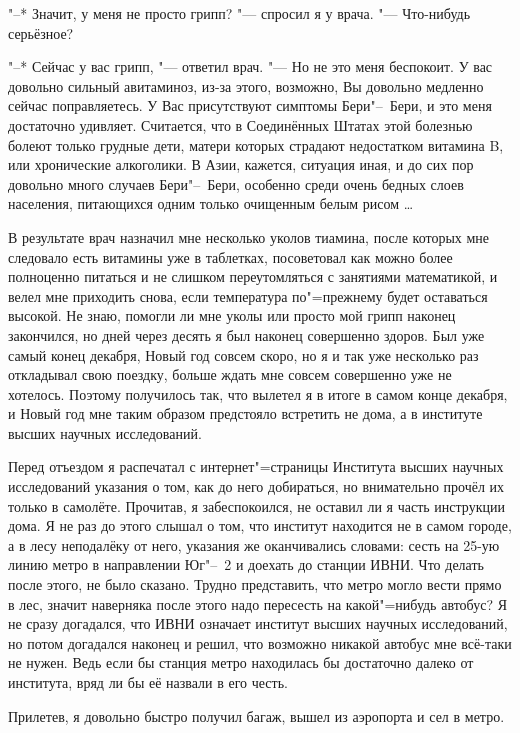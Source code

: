 "--* Значит, у меня не просто грипп? "--- спросил я у врача.
"--- Что-нибудь серьёзное?

"--* Сейчас у вас грипп, "--- ответил врач.
"--- Но не это меня беспокоит.
У вас довольно сильный авитаминоз, из-за этого, возможно, Вы довольно медленно
сейчас поправляетесь.
У Вас присутствуют симптомы Бери"--~Бери, и это меня достаточно удивляет.
Считается, что в Соединённых Штатах этой болезнью болеют только грудные дети,
матери которых страдают недостатком витамина B, или хронические алкоголики.
В Азии, кажется, ситуация иная, и до сих пор довольно много случаев Бери"--~Бери,
особенно среди очень бедных слоев населения, питающихся одним только очищенным
белым рисом \ldots

В результате врач назначил мне несколько уколов тиамина, после которых мне
следовало есть витамины уже в таблетках, посоветовал как можно более полноценно
питаться и не слишком переутомляться с занятиями математикой, и велел мне
приходить снова, если температура по"=прежнему будет оставаться высокой.
Не знаю, помогли ли мне уколы или просто мой грипп наконец закончился, но дней
через десять я был наконец совершенно здоров.
Был уже самый конец декабря, Новый год совсем скоро, но я и так уже несколько
раз откладывал свою поездку, больше ждать мне совсем совершенно уже не хотелось.
Поэтому получилось так, что вылетел я в итоге в самом конце декабря, и Новый год
мне таким образом предстояло встретить не дома, а в институте высших научных
исследований.

Перед отъездом я распечатал с интернет"=страницы Института высших научных
исследований указания о том, как до него добираться, но внимательно прочёл их
только в самолёте.
Прочитав, я забеспокоился, не оставил ли я часть инструкции дома.
Я не раз до этого слышал о том, что институт находится не в самом городе, а в
лесу неподалёку от него, указания же оканчивались словами: сесть на 25-ую линию
метро в направлении Юг"--~2 и доехать до станции ИВНИ.
Что делать после этого, не было сказано.
Трудно представить, что метро могло вести прямо в лес, значит наверняка после
этого надо пересесть на какой"=нибудь автобус?
Я не сразу догадался, что ИВНИ означает институт высших научных исследований,
но потом догадался наконец и решил, что возможно никакой автобус мне всё-таки не
нужен.
Ведь если бы станция метро находилась бы достаточно далеко от института, вряд ли
бы её назвали в его честь.

Прилетев, я довольно быстро получил багаж, вышел из аэропорта и сел в метро.

